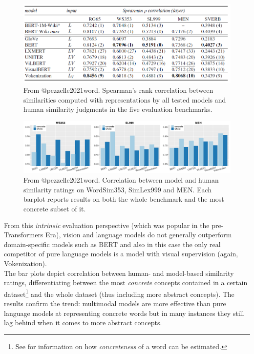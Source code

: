 \documentclass[
]{krantz}
\begin{document}
\begin{figure}

{\centering \includegraphics[width=1\linewidth]{figures/02-03-img-support-text/img-pezzele2021-01} 

}

\caption{From @pezzelle2021word. Spearman’s rank correlation between similarities computed with representations by all tested models and human similarity judgments in the five evaluation benchmarks.}\label{fig:img-pezzele2021-01}
\end{figure}

\begin{figure}

{\centering \includegraphics[width=1\linewidth]{figures/02-03-img-support-text/img-pezzele2021-02} 

}

\caption{From @pezzelle2021word. Correlation between model and human similarity ratings on WordSim353, SimLex999 and MEN. Each barplot reports results on both the whole benchmark and the most concrete subset of it.}\label{fig:img-pezzele2021-02}
\end{figure}

From this \emph{intrinsic} evaluation perspective (which was popular in the pre-Transformers Era), vision and language models do not generally outperform domain-specific models such as BERT and also in this case the only real competitor of pure language models is a model with visual supervision (again, Vokenization).\\
The bar plots depict correlation between human- and model-based similarity ratings, differentiating between the most \emph{concrete} concepts contained in a certain dataset\footnote{See \citet{brysbaert2014concreteness} for information on how \emph{concreteness} of a word can be estimated.} and the whole dataset (thus including more abstract concepts). The results confirm the trend: multimodal models are more effective than pure language models at representing concrete words but in many instances they still lag behind when it comes to more abstract concepts.
\end{document}

